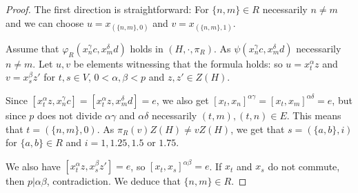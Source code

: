 \documentclass[10pt,a4paper]{amsart}
\begin{document}
\begin{proof}
    The first direction is straightforward: For $\{n,m\}\in R$ necessarily $n\neq m$ and we can choose $u=x_{(\{n,m\},0)}$ and $v=x_{(\{n,m\},1)}$.

    Assume that $\varphi_R(x_n^\gamma c,x_m^\delta d)$ holds in $(H,\cdot ,\pi_R)$. As $\psi(x_n^\gamma c,x_m^\delta d)$ necessarily $n\neq m$. Let $u,v$ be elements witnessing that the formula holds: so $u=x_t^{\alpha}z$ and $v=x_s^{\beta}z'$ for $t,s\in V$, $0< \alpha,\beta< p$ and $z,z'\in Z(H)$. 

    Since $[x_t^{\alpha}z,x_n^\gamma c]=[x_t^{\alpha}z,x_m^\delta d]=e$, we also get $[x_t,x_n]^{\alpha \gamma}=[x_t,x_m]^{\alpha \delta}=e$, but since $p$ does not divide $\alpha\gamma$ and $\alpha\delta$ necessarily $(t,m),(t,n)\in E$. This means that $t=(\{n,m\},0)$. As $\pi_R(v)Z(H)\neq vZ(H)$, we get that $s=(\{a,b\},i)$ for $\{a,b\}\in R$ and $i=1,1.25,1.5$ or $1.75$. 
    
    We also have $[x_t^{\alpha}z,x_s^{\beta}z']=e$, so $[x_t,x_s]^{\alpha\beta}=e$. If $x_t$ and $x_s$ do not commute, then  $p|\alpha\beta$, contradiction. We deduce that $\{n,m\}\in R$.
\end{proof}
\end{document}
